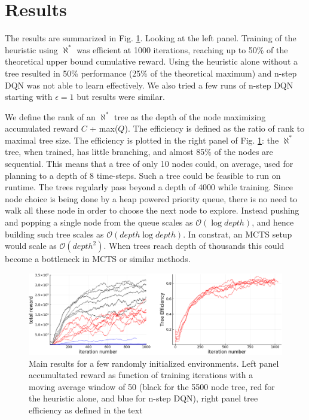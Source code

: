 \documentclass{article}
\newcommand{\alephstar}{$\aleph^*$ }
\begin{document}
\section{Results}
\label{sec:results}

The results are summarized in Fig. \ref{fig:results}. Looking at the left panel. Training of the heuristic using \alephstar was efficient at 1000 iterations, reaching up to 50\% of the theoretical upper bound cumulative reward. Using the heuristic alone without a tree resulted in 50\% performance (25\% of the theoretical maximum) and n-step DQN was not able to learn effectively. We also tried a few runs of n-step DQN starting with $\epsilon=1$ but results were similar.

We define the rank of an \alephstar tree as the depth of the node maximizing accumulated reward $C$ + max($Q$). The efficiency is defined as the ratio of rank to maximal tree size. The efficiency is plotted in the right panel of Fig. \ref{fig:results}: the \alephstar tree, when trained, has little branching, and almost 85\% of the nodes are sequential. This means that a tree of only 10 nodes could, on average, used for planning to a depth of 8 time-steps. Such a tree could be feasible to run on runtime. The trees regularly pass beyond a depth of 4000 while training. Since node choice is being done by a heap powered priority queue, there is no need to walk all these node in order to choose the next node to explore. Instead pushing and popping a single node from the queue scales as $\mathcal{O}(\log{depth})$, and hence building such tree scales as $\mathcal{O}(depth \log{depth})$. In constrat, an MCTS setup would scale as $\mathcal{O}(depth^2)$. When trees reach depth of thousands this could become a bottleneck in MCTS or similar methods.

\begin{figure}[h]
  \centering
  \includegraphics[width=1.0\textwidth]{images/results.png}
  \caption{Main results for a few randomly initialized environments. Left panel accumultated reward as function of training iterations with a moving average window of 50 (black for the 5500 node tree, red for the heuristic alone, and blue for n-step DQN), right panel tree efficiency as defined in the text}
  \label{fig:results}
\end{figure}
\end{document}
